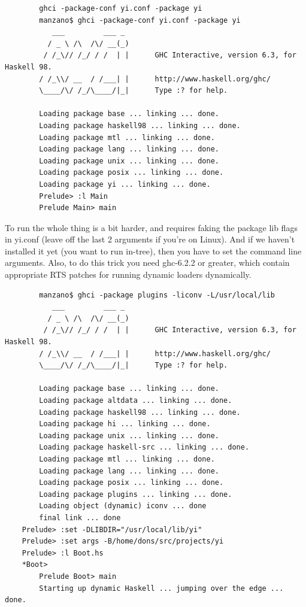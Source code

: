 \documentclass[]{article}
\begin{document}
{\small
\begin{verbatim}
        ghci -package-conf yi.conf -package yi
        manzano$ ghci -package-conf yi.conf -package yi
           ___         ___ _
          / _ \ /\  /\/ __(_)
         / /_\// /_/ / /  | |      GHC Interactive, version 6.3, for Haskell 98.
        / /_\\/ __  / /___| |      http://www.haskell.org/ghc/
        \____/\/ /_/\____/|_|      Type :? for help.

        Loading package base ... linking ... done.
        Loading package haskell98 ... linking ... done.
        Loading package mtl ... linking ... done.
        Loading package lang ... linking ... done.
        Loading package unix ... linking ... done.
        Loading package posix ... linking ... done.
        Loading package yi ... linking ... done.
        Prelude> :l Main
        Prelude Main> main
\end{verbatim}
}

To run the whole thing is a bit harder, and requires faking the package
lib flags in yi.conf (leave off the last 2 arguments if you're on Linux). And
if we haven't installed it yet (you want to run in-tree), then you have
to set the command line arguments. Also, to do this trick you need ghc-6.2.2
or greater, which contain appropriate RTS patches for running dynamic
loaders dynamically.

{\small
\begin{verbatim}
        manzano$ ghci -package plugins -liconv -L/usr/local/lib
           ___         ___ _
          / _ \ /\  /\/ __(_)
         / /_\// /_/ / /  | |      GHC Interactive, version 6.3, for Haskell 98.
        / /_\\/ __  / /___| |      http://www.haskell.org/ghc/
        \____/\/ /_/\____/|_|      Type :? for help.

        Loading package base ... linking ... done.
        Loading package altdata ... linking ... done.
        Loading package haskell98 ... linking ... done.
        Loading package hi ... linking ... done.
        Loading package unix ... linking ... done.
        Loading package haskell-src ... linking ... done.
        Loading package mtl ... linking ... done.
        Loading package lang ... linking ... done.
        Loading package posix ... linking ... done.
        Loading package plugins ... linking ... done.
        Loading object (dynamic) iconv ... done
        final link ... done
    Prelude> :set -DLIBDIR="/usr/local/lib/yi"
    Prelude> :set args -B/home/dons/src/projects/yi
    Prelude> :l Boot.hs
    *Boot>
        Prelude Boot> main
        Starting up dynamic Haskell ... jumping over the edge ... done.
\end{verbatim}
}
\end{document}
